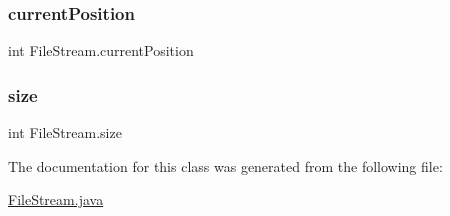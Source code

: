 \hypertarget{class_file_stream_a3d1da0e929f30d4ec245b2864285ad67}{}\label{class_file_stream_a3d1da0e929f30d4ec245b2864285ad67} 
\subsubsection{\texorpdfstring{current\+Position}{currentPosition}}
{\footnotesize\ttfamily int File\+Stream.\+current\+Position\hspace{0.3cm}{\ttfamily [private]}}

\hypertarget{class_file_stream_a0c4c084f04036a1a234eb04bf052bc1c}{}\label{class_file_stream_a0c4c084f04036a1a234eb04bf052bc1c} 
\subsubsection{\texorpdfstring{size}{size}}
{\footnotesize\ttfamily int File\+Stream.\+size\hspace{0.3cm}{\ttfamily [private]}}



The documentation for this class was generated from the following file\+:\begin{DoxyCompactItemize}
\item 
\hyperlink{_file_stream_8java}{File\+Stream.\+java}\end{DoxyCompactItemize}
